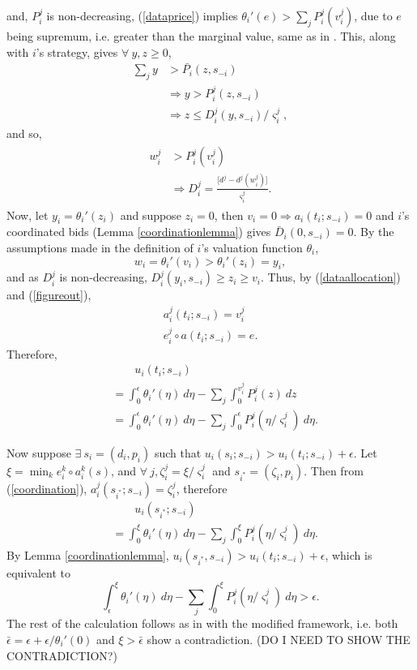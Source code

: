 \documentclass[12pt]{article}
\theoremstyle{definition}
\newcommand{\vs}{\varsigma}
\begin{document}
\begin{multicols}{2}
and, $P_i^j$ is non-decreasing, (\ref{dataprice}) implies
$\theta_i'(e) >\sum_j P_i^j(v_i^j)$, due to $e$ being supremum, i.e.
greater than the marginal value, same as in \cite{semret}. This,
along with $i$'s strategy, gives $\forall \ y,z \ge 0$,
\begin{align*}
    \displaystyle\sum_{j} y &> \bar{P_i}(z,s_{-i}) \\
    &\Rightarrow y > P_i^j(z,s_{-i})\\
    &\Rightarrow
    z \le D_i^j(y,s_{-i})/\vs_i^j,
\end{align*}
and so,
\begin{align}\label{figureout}
\begin{split}
    w_i^j & > {P}_i^j(v_i^j) \\
    &\Rightarrow {D}_i^j = \frac{\lbrack d^j - d^j(w_i^j)\rbrack}{\vs_i^j}.
\end{split}
\end{align}
Now, let $y_i = {\theta_i}'(z_i)$ and suppose $z_i = 0$, then $v_i=0 \Rightarrow
a_i(t_i; s_{-i})=0$ and $i$'s coordinated bids (Lemma \ref{coordinationlemma})
gives $\bar{D}_i(0,s_{-i}) =0$. 
By the assumptions made in the definition of $i$'s valuation function $\theta_i$,
$$
w_i = {\theta_i}'(v_i) > {\theta_i}'(z_i) = y_i,
$$
and as $D_i^j$ is non-decreasing, $D_i^j(y_i,s_{-i}) \ge z_i \ge v_i$.
Thus, by (\ref{dataallocation}) and (\ref{figureout}),
\begin{align*}
    a_i^j(t_i; s_{-i}) = v_i^j \\
    e_i^j \circ a(t_i;s_{-i}) = e.
\end{align*}
Therefore,
\begin{align*}
    &\qquad u_i(t_i;s_{-i}) \\
    &= \displaystyle\int_0^\epsilon {\theta_i}'(\eta) \ d\eta -
\sum_j \int_0^{v_i^j} P_i^j(z) \ dz \\
    &= \int_0^\epsilon {\theta_i}'(\eta) \ d\eta - \sum_j\int_0^\epsilon
P_i^j(\eta/\vs_i^j) \ d\eta.
\end{align*}

Now suppose $\exists \ s_i = (d_i, p_i)$ such that $u_i(s_i;s_{-i}) > u_i(t_i;
s_{-i}) + \epsilon$. Let $\xi = \min_k e_i^k\circ a_i^k(s)$, and $\forall \ j,
\zeta_i^j = \xi/\vs_i^j$ and $s_{i^*} = (\zeta_i,p_i)$. Then from
(\ref{coordination}), $a_i^j(s_{i^*}; s_{-i}) = \zeta_i^j$, therefore
\begin{align*}
    &\qquad u_i(s_{i^*};s_{-i}) \\
    &= \displaystyle\int_0^\xi {\theta_i}'(\eta)\ d\eta -\sum_j\int_0^\xi P_i^j(\eta/\vs_i^j) \ d\eta.
\end{align*}
By Lemma \ref{coordinationlemma}, $u_i(s_{i^*}, s_{-i}) > u_i(t_i; s_{-i}) +
\epsilon$, which is equivalent to 
$$
    \int_\epsilon^\xi {\theta_i}'(\eta) \ d\eta - \sum_j\int_0^\xi
P_i^j(\eta/\vs_i^j) \ d\eta > \epsilon.
$$
The rest of the calculation follows as in \cite{semret} with the modified
framework, i.e. both $\bar\epsilon = \epsilon + \epsilon/{\theta_i}'(0)$ and
$\xi > \bar\epsilon$ show a contradiction.
(DO I NEED TO SHOW THE CONTRADICTION?)


\end{multicols}
\end{document}
